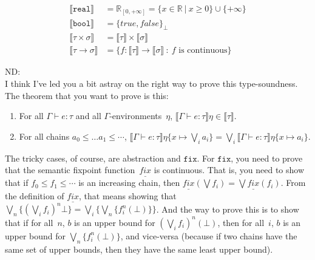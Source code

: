 \documentclass{westhesis}
\newenvironment{ndBlockComment}{\begin{oframed}\noindent ND:\\}{\end{oframed}}
\newcommand{\tmden}[2]{\llbracket{#1}\rrbracket{#2}}
\newcommand{\tyden}[1]{\llbracket{#1}\rrbracket}
\newcommand{\typing}[3]{{#1}\vdash{#2}:{#3}}
\newcommand{\extend}[3]{#1\{{#2}\mapsto{#3}\}}
\newcommand{\sfix}{\mathtt{fix}}
\newcommand{\smfix}{\underline{\mathit{fix}}}
\newcommand{\set}[1]{\{#1\}}
\let\bottom\bot
\newcommand{\R}{\mathbb{R}}
\begin{document}
 \begin{align*}
\llbracket \texttt{real} \rrbracket &= \R_{[0, +\infty]} = \{x \in \R \ | \ x \geq 0\} \cup \{+\infty\} \\
 \llbracket \texttt{bool} \rrbracket &= {\{true, false\}}_{\perp} \\
 \llbracket \tau \times \sigma \rrbracket &= \llbracket \tau \rrbracket \times \llbracket \sigma \rrbracket  \\
 \llbracket \tau \rightarrow \sigma \rrbracket &= \{f: \llbracket \tau \rrbracket \rightarrow \llbracket \sigma \rrbracket \ : 
 \ f \text{ is continuous}\}
 \end{align*}

\begin{ndBlockComment}
I think I've led you a bit astray on the right way to prove this
type-soundness.  The theorem that you want to prove is this:
\begin{enumerate}
\item For all $\Gamma\vdash e : \tau$ and all $\Gamma$-environments~$\eta$,
$\tmden{\typing\Gamma e\tau}\eta\in\tyden{\tau}$.
\item For all chains $a_0\leq\dots a_1\leq\dotsb$,
$\tmden{\typing\Gamma e\tau}{\extend\eta x {\bigvee_i a_i}} =
\bigvee_i\tmden{\typing\Gamma e\tau}{\extend\eta x {a_i}}$.
\end{enumerate}
The tricky cases, of course, are abstraction and $\sfix$.  For
$\sfix$, you need to prove that the semantic fixpoint function~$\smfix$
is continuous.  That is, you need to show that if $f_0\leq f_1\leq\dotsb$
is an increasing chain, then
$\smfix(\bigvee f_i) = \bigvee\smfix(f_i)$.  From the definition
of $\smfix$, that means showing that
$\bigvee_n\set{(\bigvee_i f_i)^n\bottom} =
\bigvee_i\set{\bigvee_n\set{f_i^n(\bottom)}}$.  And the way to prove this
is to show that if for all~$n$, $b$ is an upper bound for
$(\bigvee_i f_i)^n(\bot)$, then for all~$i$, $b$ is an upper bound
for $\bigvee_n\set{f_i^n(\bot)}$, and vice-versa (because if two chains
have the same set of upper bounds, then they have the same least upper
bound).
\end{ndBlockComment}
\end{document}
